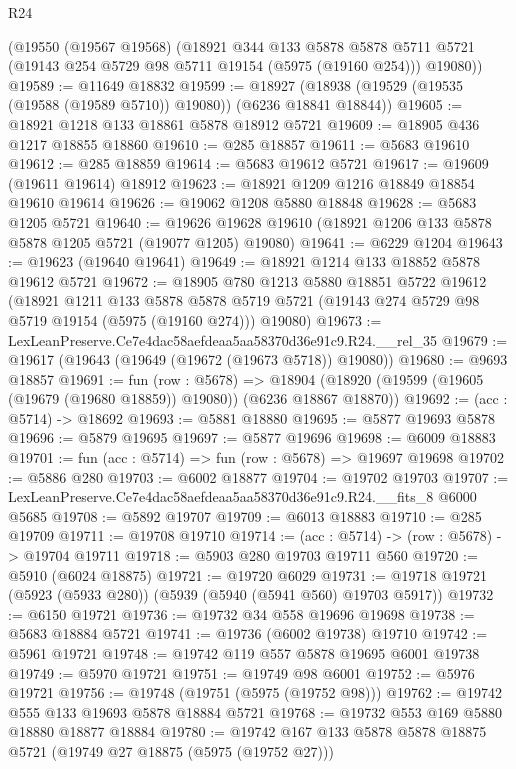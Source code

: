 \begin{lexlean}{R24}
\begin{coremodule}
    (@19550
      (@19567 @19568)
      (@18921
        @344
        @133
        @5878
        @5878
        @5711
        @5721
        (@19143 @254 @5729 @98 @5711 @19154 (@5975 (@19160 @254)))
        @19080))
@19589 := @11649 @18832
@19599 := @18927 (@18938 (@19529 (@19535 (@19588 (@19589 @5710)) @19080)) (@6236 @18841 @18844))
@19605 := @18921 @1218 @133 @18861 @5878 @18912 @5721
@19609 := @18905 @436 @1217 @18855 @18860
@19610 := @285 @18857
@19611 := @5683 @19610
@19612 := @285 @18859
@19614 := @5683 @19612 @5721
@19617 := @19609 (@19611 @19614) @18912
@19623 := @18921 @1209 @1216 @18849 @18854 @19610 @19614
@19626 := @19062 @1208 @5880 @18848
@19628 := @5683 @1205 @5721
@19640 := @19626 @19628 @19610 (@18921 @1206 @133 @5878 @5878 @1205 @5721 (@19077 @1205) @19080)
@19641 := @6229 @1204
@19643 := @19623 (@19640 @19641)
@19649 := @18921 @1214 @133 @18852 @5878 @19612 @5721
@19672 := @18905
    @780
    @1213
    @5880
    @18851
    @5722
    @19612
    (@18921
      @1211
      @133
      @5878
      @5878
      @5719
      @5721
      (@19143 @274 @5729 @98 @5719 @19154 (@5975 (@19160 @274)))
      @19080)
@19673 := LexLeanPreserve.Ce7e4dac58aefdeaa5aa58370d36e91c9.R24.__rel_35
@19679 := @19617 (@19643 (@19649 (@19672 (@19673 @5718)) @19080))
@19680 := @9693 @18857
@19691 := fun (row : @5678) =>
  @18904 (@18920 (@19599 (@19605 (@19679 (@19680 @18859)) @19080)) (@6236 @18867 @18870))
@19692 := (acc : @5714) -> @18692
@19693 := @5881 @18880
@19695 := @5877 @19693 @5878
@19696 := @5879 @19695
@19697 := @5877 @19696
@19698 := @6009 @18883
@19701 := fun (acc : @5714) => fun (row : @5678) => @19697 @19698
@19702 := @5886 @280
@19703 := @6002 @18877
@19704 := @19702 @19703
@19707 := LexLeanPreserve.Ce7e4dac58aefdeaa5aa58370d36e91c9.R24.__fits_8 @6000 @5685
@19708 := @5892 @19707
@19709 := @6013 @18883
@19710 := @285 @19709
@19711 := @19708 @19710
@19714 := (acc : @5714) -> (row : @5678) -> @19704 @19711
@19718 := @5903 @280 @19703 @19711 @560
@19720 := @5910 (@6024 @18875)
@19721 := @19720 @6029
@19731 := @19718 @19721 (@5923 (@5933 @280)) (@5939 (@5940 (@5941 @560) @19703 @5917))
@19732 := @6150 @19721
@19736 := @19732 @34 @558 @19696 @19698
@19738 := @5683 @18884 @5721
@19741 := @19736 (@6002 @19738) @19710
@19742 := @5961 @19721
@19748 := @19742 @119 @557 @5878 @19695 @6001 @19738
@19749 := @5970 @19721
@19751 := @19749 @98 @6001
@19752 := @5976 @19721
@19756 := @19748 (@19751 (@5975 (@19752 @98)))
@19762 := @19742 @555 @133 @19693 @5878 @18884 @5721
@19768 := @19732 @553 @169 @5880 @18880 @18877 @18884
@19780 := @19742 @167 @133 @5878 @5878 @18875 @5721 (@19749 @27 @18875 (@5975 (@19752 @27)))

\end{coremodule}
\end{lexlean}
